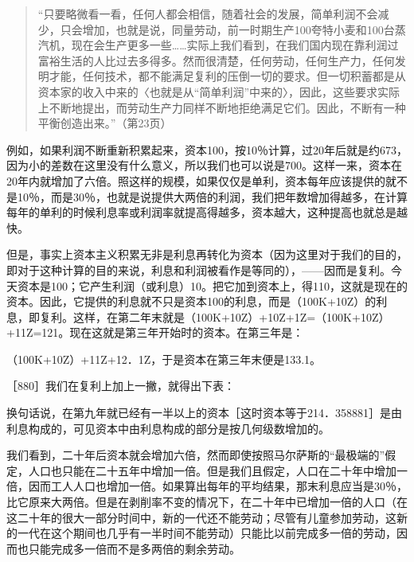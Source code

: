 
\begin{quote}{“只要略微看一看，任何人都会相信，随着社会的发展，简单利润不会减少，只会增加，也就是说，同量劳动，前一时期生产100夸特小麦和100台蒸汽机，现在会生产更多一些……实际上我们看到，在我们国内现在靠利润过富裕生活的人比过去多得多。然而很清楚，任何劳动，任何生产力，任何发明才能，任何技术，都不能满足复利的压倒一切的要求。但一切积蓄都是从资本家的收入中来的〈也就是从“简单利润”中来的〉，因此，这些要求实际上不断地提出，而劳动生产力同样不断地拒绝满足它们。因此，不断有一种平衡创造出来。”（第23页）}\end{quote}

例如，如果利润不断重新积累起来，资本100，按10％计算，过20年后就是约673，因为小的差数在这里没有什么意义，所以我们也可以说是700。这样一来，资本在20年内就增加了六倍。照这样的规模，如果仅仅是单利，资本每年应该提供的就不是10％，而是30％，也就是说提供大两倍的利润，我们把年数增加得越多，在计算每年的单利的时候利息率或利润率就提高得越多，资本越大，这种提高也就总是越快。

但是，事实上资本主义积累无非是利息再转化为资本（因为这里对于我们的目的，即对于这种计算的目的来说，利息和利润被看作是等同的），——因而是复利。今天资本是100；它产生利润（或利息）10。把它加到资本上，得110，这就是现在的资本。因此，它提供的利息就不只是资本100的利息，而是（100K+10Z）的利息，即复利。这样，在第二年末就是（100K+10Z）+10Z+1Z=（100K+10Z）+11Z=121。现在这就是第三年开始时的资本。在第三年是：

（100K+10Z）+11Z+12．1Z，于是资本在第三年末便是133.1。

［880］我们在复利上加上一撇，就得出下表：

\todo{}

换句话说，在第九年就已经有一半以上的资本［这时资本等于214．358881］是由利息构成的，可见资本中由利息构成的部分是按几何级数增加的。

我们看到，二十年后资本就会增加六倍，然而即使按照马尔萨斯的“最极端的”假定，人口也只能在二十五年中增加一倍。但是我们且假定，人口在二十年中增加一倍，因而工人人口也增加一倍。如果算出每年的平均结果，那末利息应当是30％，比它原来大两倍。但是在剥削率不变的情况下，在二十年中已增加一倍的人口（在这二十年的很大一部分时间中，新的一代还不能劳动；尽管有儿童参加劳动，这新的一代在这个期间也几乎有一半时间不能劳动）只能比以前完成多一倍的劳动，因而也只能完成多一倍而不是多两倍的剩余劳动。

